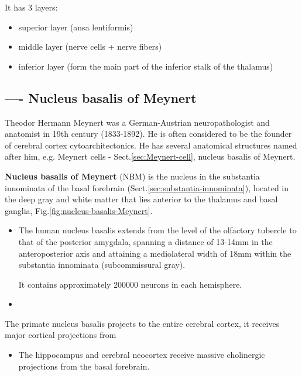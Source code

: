 It has 3 layers:
\begin{itemize}
  \item superior layer (ansa lentiformis)
  \item middle layer (nerve cells + nerve fibers)
  \item inferior layer (form the main part of the inferior stalk of the
  thalamus)
\end{itemize}

\subsection{---- Nucleus basalis of Meynert}
\label{sec:nucleus-basalis}

\begin{mdframed}
Theodor Hermann Meynert was a German-Austrian neuropathologist and anatomist in
19th century (1833-1892). He is often considered to be the founder of cerebral
cortex cytoarchitectonics. He has several anatomical structures named after him,
e.g. Meynert cells - Sect.\ref{sec:Meynert-cell}, nucleus basalis of Meynert.
\end{mdframed}

{\bf Nucleus basalis of Meynert} (NBM) is the nucleus in the substantia
innominata of the basal forebrain (Sect.\ref{sec:substantia-innominata}),
located in the deep gray and white matter that lies anterior to the thalamus and
basal ganglia, Fig.\ref{fig:nucleus-basalis-Meynert}.
\begin{itemize}
  \item  The human nucleus basalis extends from the level of the olfactory
  tubercle to that of the posterior amygdala, spanning a distance of 13-14mm in
  the anteroposterior axis and attaining a mediolateral width of 18mm within the
  substantia innominata (subcommissural gray).
  
It contains approximately 200000 neurons in each hemisphere.

  \item   
  
\end{itemize}
The primate nucleus basalis projects to the entire cerebral cortex, it receives
major cortical projections from 
\begin{itemize}
  \item  The hippocampus and cerebral neocortex receive massive cholinergic
  projections from the basal forebrain.
\end{itemize}


